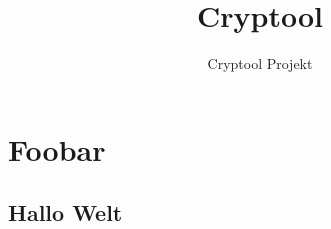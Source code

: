 \documentclass[ngerman]{book}
\title{Cryptool}
\author{Cryptool Projekt}
\begin{document}
\maketitle 
 
\tableofcontents
 
 \chapter{Foobar}
 
 \section{Hallo Welt}
 
 
 \blindtext[3]

%
 
\end{document}
